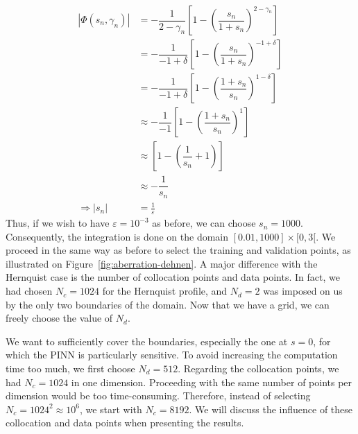 \begin{align*}
    \label{eq:final-value-hernquist}
    |\Phi(s_n, \gamma_n)| &= -\dfrac{1}{2 - \gamma_n} \left[1 - \left( \dfrac{s_n}{1 + s_n} \right )^{2-\gamma_n}\right] \\
    &= -\dfrac{1}{- 1 + \delta} \left[1 - \left( \dfrac{s_n}{1 + s_n} \right )^{- 1 + \delta}\right] \\
    &= -\dfrac{1}{- 1 + \delta} \left[1 - \left( \dfrac{1 + s_n}{s_n} \right )^{1 - \delta}\right] \\
    &\approx -\dfrac{1}{- 1} \left[1 - \left( \dfrac{1 + s_n}{s_n} \right )^{1}\right]\\
    &\approx \left[1 - \left( \dfrac{1}{s_n} + 1 \right )\right]\\
    &\approx - \dfrac{1}{s_n}\\
    \Rightarrow |s_n| &= \frac{1}{\varepsilon}
\end{align*} Thus, if we wish to have $\varepsilon=10^{-3}$ as before, we can choose $s_n=1000$. Consequently, the integration is done on the domain $[0.01, 1000] \times [0, 3[$. We proceed in the same way as before to select the training and validation points, as illustrated on Figure~\ref{fig:aberration-dehnen}. A major difference with the Hernquist case is the number of collocation points and data points. In fact, we had chosen $N_c=1024$ for the Hernquist profile, and $N_d=2$ was imposed on us by the only two boundaries of the domain. Now that we have a grid, we can freely choose the value of $N_d$.
\par We want to sufficiently cover the boundaries, especially the one at $s=0$, for which the PINN is particularly sensitive. To avoid increasing the computation time too much, we first choose $N_d=512$. Regarding the collocation points, we had $N_c=1024$ in one dimension. Proceeding with the same number of points per dimension would be too time-consuming. Therefore, instead of selecting $N_c=1024^2 \approx 10^6$, we start with $N_c=8192$. We will discuss the influence of these collocation and data points when presenting the results.

